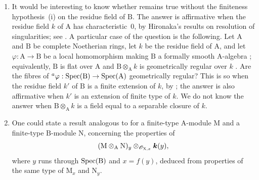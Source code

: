 \begin{remarks}[7.5.4]
\label{IV.7.5.4}
\begin{enumerate}[label=(\roman*)]
  \item It would be interesting to know whether  remains true without the finiteness hypothesis~(i) on the residue field of $\mathrm{B}$. The answer is affirmative when the residue field $k$ of $\mathrm{A}$ has characteristic~$0$, by Hironaka's results on resolution of singularities; see . A particular case of the question is the following. Let $\mathrm{A}$ and $\mathrm{B}$ be complete Noetherian rings, let $k$ be the residue field of $\mathrm{A}$, and let $\varphi:\mathrm{A}\to\mathrm{B}$ be a local homomorphism making $\mathrm{B}$ a formally smooth $\mathrm{A}$-algebra ; equivalently, $\mathrm{B}$ is flat over $\mathrm{A}$ and $\mathrm{B}\otimes_\mathrm{A}k$ is geometrically regular over $k$ . Are the fibres of ${}^a\varphi:\operatorname{Spec}(\mathrm{B})\to\operatorname{Spec}(\mathrm{A})$ geometrically regular? This is so when the residue field $k'$ of $\mathrm{B}$ is a finite extension of $k$, by ; the answer is also affirmative when $k'$ is an extension of finite type of $k$. We do not know the answer when $\mathrm{B}\otimes_\mathrm{A}k$ is a field equal to a separable closure of $k$.

  \item One could state a result analogous to  for a finite-type $\mathrm{A}$-module $\mathrm{M}$ and a finite-type $\mathrm{B}$-module $\mathrm{N}$, concerning the properties of
  \[
    (\mathrm{M}\otimes_\mathrm{A}\mathrm{N})_y
    \otimes_{\mathscr{O}_{\mathrm{X},x}}\boldsymbol{k}(y),
  \]
  where $y$ runs through $\operatorname{Spec}(\mathrm{B})$ and $x=f(y)$, deduced from properties of the same type of $\mathrm{M}_x$ and $\mathrm{N}_y$.


\end{enumerate}
\end{remarks}
